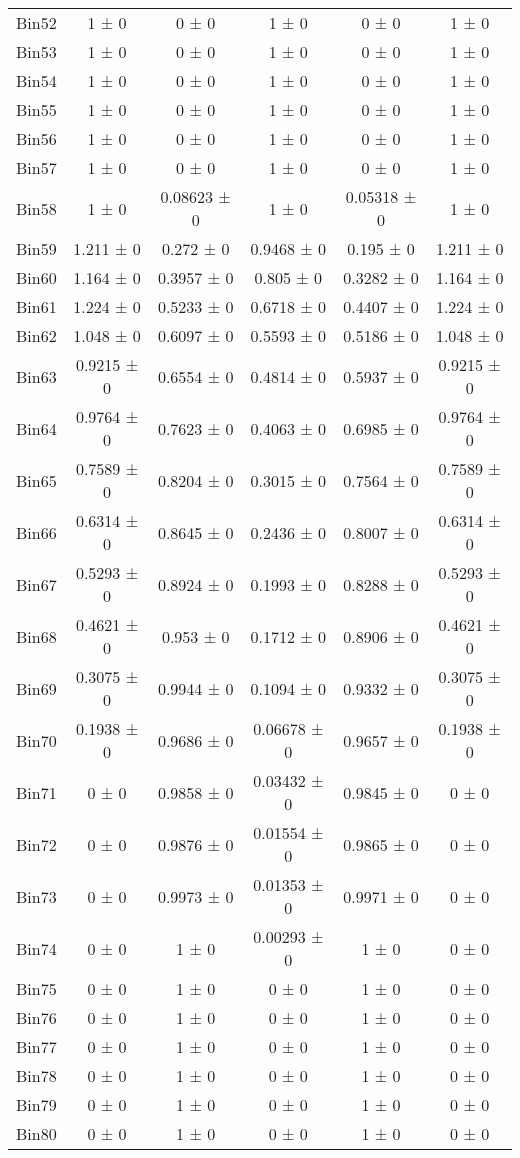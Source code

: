 \begin{tabular}{@{\extracolsep{4pt}}lccccc@{}}
     Bin52 & 1 ± 0 & 0 ± 0 & 1 ± 0 & 0 ± 0 & 1 ± 0 \\ 
     Bin53 & 1 ± 0 & 0 ± 0 & 1 ± 0 & 0 ± 0 & 1 ± 0 \\ 
     Bin54 & 1 ± 0 & 0 ± 0 & 1 ± 0 & 0 ± 0 & 1 ± 0 \\ 
     Bin55 & 1 ± 0 & 0 ± 0 & 1 ± 0 & 0 ± 0 & 1 ± 0 \\ 
     Bin56 & 1 ± 0 & 0 ± 0 & 1 ± 0 & 0 ± 0 & 1 ± 0 \\ 
     Bin57 & 1 ± 0 & 0 ± 0 & 1 ± 0 & 0 ± 0 & 1 ± 0 \\ 
     Bin58 & 1 ± 0 & 0.08623 ± 0 & 1 ± 0 & 0.05318 ± 0 & 1 ± 0 \\ 
     Bin59 & 1.211 ± 0 & 0.272 ± 0 & 0.9468 ± 0 & 0.195 ± 0 & 1.211 ± 0 \\ 
     Bin60 & 1.164 ± 0 & 0.3957 ± 0 & 0.805 ± 0 & 0.3282 ± 0 & 1.164 ± 0 \\ 
     Bin61 & 1.224 ± 0 & 0.5233 ± 0 & 0.6718 ± 0 & 0.4407 ± 0 & 1.224 ± 0 \\ 
     Bin62 & 1.048 ± 0 & 0.6097 ± 0 & 0.5593 ± 0 & 0.5186 ± 0 & 1.048 ± 0 \\ 
     Bin63 & 0.9215 ± 0 & 0.6554 ± 0 & 0.4814 ± 0 & 0.5937 ± 0 & 0.9215 ± 0 \\ 
     Bin64 & 0.9764 ± 0 & 0.7623 ± 0 & 0.4063 ± 0 & 0.6985 ± 0 & 0.9764 ± 0 \\ 
     Bin65 & 0.7589 ± 0 & 0.8204 ± 0 & 0.3015 ± 0 & 0.7564 ± 0 & 0.7589 ± 0 \\ 
     Bin66 & 0.6314 ± 0 & 0.8645 ± 0 & 0.2436 ± 0 & 0.8007 ± 0 & 0.6314 ± 0 \\ 
     Bin67 & 0.5293 ± 0 & 0.8924 ± 0 & 0.1993 ± 0 & 0.8288 ± 0 & 0.5293 ± 0 \\ 
     Bin68 & 0.4621 ± 0 & 0.953 ± 0 & 0.1712 ± 0 & 0.8906 ± 0 & 0.4621 ± 0 \\ 
     Bin69 & 0.3075 ± 0 & 0.9944 ± 0 & 0.1094 ± 0 & 0.9332 ± 0 & 0.3075 ± 0 \\ 
     Bin70 & 0.1938 ± 0 & 0.9686 ± 0 & 0.06678 ± 0 & 0.9657 ± 0 & 0.1938 ± 0 \\ 
     Bin71 & 0 ± 0 & 0.9858 ± 0 & 0.03432 ± 0 & 0.9845 ± 0 & 0 ± 0 \\ 
     Bin72 & 0 ± 0 & 0.9876 ± 0 & 0.01554 ± 0 & 0.9865 ± 0 & 0 ± 0 \\ 
     Bin73 & 0 ± 0 & 0.9973 ± 0 & 0.01353 ± 0 & 0.9971 ± 0 & 0 ± 0 \\ 
     Bin74 & 0 ± 0 & 1 ± 0 & 0.00293 ± 0 & 1 ± 0 & 0 ± 0 \\ 
     Bin75 & 0 ± 0 & 1 ± 0 & 0 ± 0 & 1 ± 0 & 0 ± 0 \\ 
     Bin76 & 0 ± 0 & 1 ± 0 & 0 ± 0 & 1 ± 0 & 0 ± 0 \\ 
     Bin77 & 0 ± 0 & 1 ± 0 & 0 ± 0 & 1 ± 0 & 0 ± 0 \\ 
     Bin78 & 0 ± 0 & 1 ± 0 & 0 ± 0 & 1 ± 0 & 0 ± 0 \\ 
     Bin79 & 0 ± 0 & 1 ± 0 & 0 ± 0 & 1 ± 0 & 0 ± 0 \\ 
     Bin80 & 0 ± 0 & 1 ± 0 & 0 ± 0 & 1 ± 0 & 0 ± 0 \\ 
\hline\hline
  \end{tabular}

